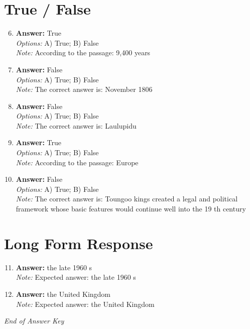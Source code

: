 \documentclass[12pt]{article}
\begin{document}
\section*{True / False}
\begin{enumerate}[label=\arabic*.]
\setcounter{enumi}{5}
\item \textbf{Answer:} True
\\ \textit{Options:} A) True; B) False
\\ \textit{Note:} According to the passage: 9,400 years
\item \textbf{Answer:} False
\\ \textit{Options:} A) True; B) False
\\ \textit{Note:} The correct answer is: November 1806
\item \textbf{Answer:} False
\\ \textit{Options:} A) True; B) False
\\ \textit{Note:} The correct answer is: Laulupidu
\item \textbf{Answer:} True
\\ \textit{Options:} A) True; B) False
\\ \textit{Note:} According to the passage: Europe
\item \textbf{Answer:} False
\\ \textit{Options:} A) True; B) False
\\ \textit{Note:} The correct answer is: Toungoo kings created a legal and political framework whose basic features would continue well into the 19 th century
\end{enumerate}

\section*{Long Form Response}
\begin{enumerate}[label=\arabic*.]
\setcounter{enumi}{10}
\item \textbf{Answer:} the late 1960 s
\\ \textit{Note:} Expected answer: the late 1960 s
\item \textbf{Answer:} the United Kingdom
\\ \textit{Note:} Expected answer: the United Kingdom
\end{enumerate}

\vfill
\noindent\textit{End of Answer Key}
\end{document}
